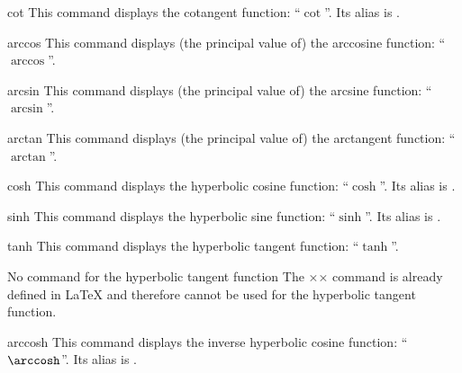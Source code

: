 \documentclass[english,nolocaltoc]{nwejmart}
\newtheorem[style=definition]{fact}
\newtheorem[title-plural=Criteria]{criterion}
\newtheorem[title=random experiment]{rexp}
\begin{document}
\begin{docCommand}{cot}{}
  This command displays  the cotangent function: \enquote{$\cot$}. Its
  alias is .
\end{docCommand}

\begin{docCommand}{arccos}{}
  This command displays  (the principal value of)  the arccosine function:
  \enquote{$\arccos$}.
\end{docCommand}

\begin{docCommand}{arcsin}{}
  This command displays  (the principal value of)  the arcsine function:
  \enquote{$\arcsin$}.
\end{docCommand}

\begin{docCommand}{arctan}{}
  This command displays  (the principal value of)  the arctangent function:
  \enquote{$\arctan$}.
\end{docCommand}

\begin{docCommand}{cosh}{}
   This command displays  the hyperbolic cosine function:
   \enquote{$\cosh$}. Its alias is .
\end{docCommand}

\begin{docCommand}{sinh}{}
  This command displays  the hyperbolic sine function:
  \enquote{$\sinh$}. Its alias is .
\end{docCommand}

\begin{docCommand}{tanh}{}
  This command displays the hyperbolic tangent function:
  \enquote{$\tanh$}.
  \begin{dbremark}{No \protect{} command  for the hyperbolic tangent function}{}
    The ×\th× command  is already defined in \LaTeX{} and therefore
    cannot be used for the hyperbolic tangent function.
  \end{dbremark}
\end{docCommand}

\begin{docCommand}{arccosh}{}
  This command displays  the inverse hyperbolic cosine function:
  \enquote{$\arccosh$}.
  Its alias is .
\end{docCommand}
\end{document}
